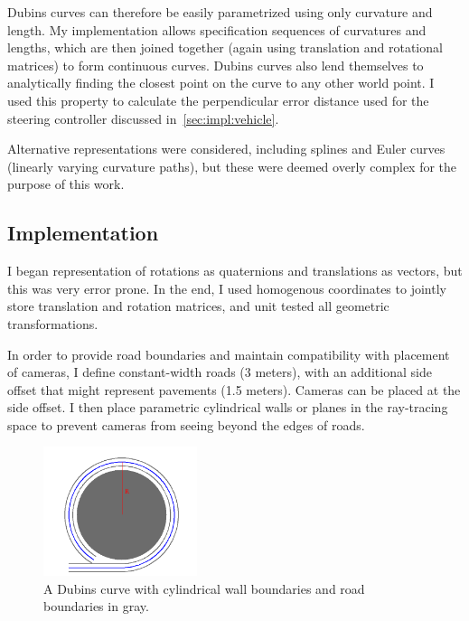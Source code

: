 \documentclass[a4paper,12pt,twoside,openright]{report}
\begin{document}
Dubins curves can therefore be easily parametrized using only curvature and length.
My implementation allows specification sequences of curvatures and lengths, which are
then joined together (again using translation and rotational matrices) to form
continuous curves. Dubins curves also lend themselves to analytically finding the closest point
on the curve to any other world point. I used this property to calculate
the perpendicular error distance used for the steering controller
discussed in~\ref{sec:impl:vehicle}.

Alternative representations were considered, including splines and
Euler curves (linearly varying curvature paths),
but these were deemed overly complex for the purpose of this work.

\subsection{Implementation}

I began representation of rotations as
quaternions and translations as vectors, but this was very error prone. 
In the end, I used homogenous coordinates to jointly store translation
and rotation matrices, and unit tested all geometric transformations.

In order to provide road boundaries and 
maintain compatibility with placement of cameras, I define
constant-width roads (3 meters), with an additional side offset that
might represent pavements (1.5 meters). Cameras can be placed at the 
side offset. I then place parametric cylindrical walls
or planes in the ray-tracing space to prevent cameras from
seeing beyond the edges of roads.

\begin{figure}[htb]
    \centering
    \includegraphics[width=0.4\textwidth]{figures/dubins_walls.png}
    \caption[Dubins Curve with Boundaries]{A Dubins curve with cylindrical wall boundaries and road boundaries in gray.}
    \label{fig:impl:dubinswalls}
\end{figure}
\end{document}
